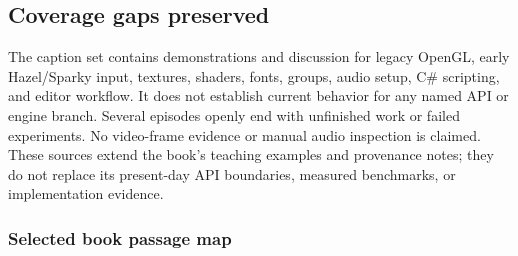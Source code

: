 {\begin{longtable}[]
\end{longtable}
}

\subsection{Coverage gaps preserved}\label{appendix-877738f6f4d2-coverage-gaps-preserved}

\hypertarget{appendix-877738f6f4d2-coverage-gaps-preserved}{}

The caption set contains demonstrations and discussion for legacy OpenGL, early Hazel/Sparky input, textures, shaders, fonts, groups, audio setup, C\# scripting, and editor workflow. It does not establish current behavior for any named API or engine branch. Several episodes openly end with unfinished work or failed experiments. No video-frame evidence or manual audio inspection is claimed. These sources extend the book's teaching examples and provenance notes; they do not replace its present-day API boundaries, measured benchmarks, or implementation evidence.

\subsubsection{Selected book passage map}\label{appendix-877738f6f4d2-selected-book-passage-map}

\hypertarget{appendix-877738f6f4d2-selected-book-passage-map}{}


